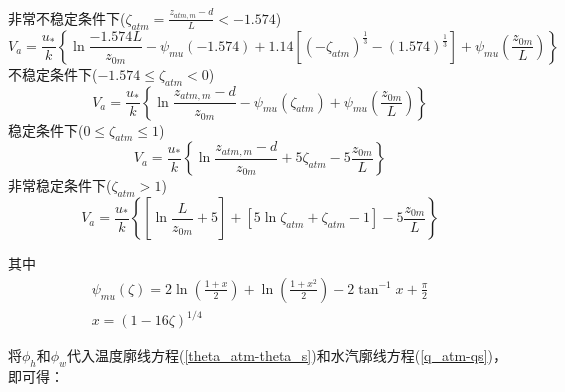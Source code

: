 \noindent 非常不稳定条件下($\zeta_{atm}=\frac{z_{atm,m}-d}{L}<-1.574$)
\begin{equation}\label{Va_VU}
V_{a}=\frac{u_{*}}{k}\left\{\ln \frac{-1.574 L}{z_{0 m}}-\psi_{mu}(-1.574)+
1.14\left[\left(-\zeta_{atm}\right)^{\frac{1}{3}}-(1.574)^{\frac{1}{3}}\right]+\psi_{mu}\left(\frac{z_{0 m}}{L}\right)\right\}
\end{equation}
不稳定条件下($-1.574\le\zeta_{atm}<0$)
\begin{equation}\label{Va_U}
V_{a}=\frac{u_{*}}{k}\left\{\ln \frac{z_{atm, m}-d}{z_{0 m}}-\psi_{mu}\left(\zeta_{atm}\right)+\psi_{mu}\left(\frac{z_{0 m}}{L}\right)\right\}
\end{equation}
稳定条件下($0\le\zeta_{atm}\le1$)
\begin{equation}\label{Va_S}
V_{a}=\frac{u_{*}}{k}\left\{\ln \frac{z_{atm, m}-d}{z_{0 m}}+5 \zeta_{atm}-5 \frac{z_{0 m}}{L}\right\}
\end{equation}
非常稳定条件下($\zeta_{atm}>1$)
\begin{equation}\label{Va_VS}
V_{a}=\frac{u_{*}}{k}\left\{\left[\ln \frac{L}{z_{0 m}}+5\right]+\left[5 \ln \zeta_{atm}+\zeta_{atm}-1\right]-5 \frac{z_{0 m}}{L}\right\}
\end{equation}

\noindent 其中
\begin{equation}\label{Psim}
\begin{array}{c}\psi_{mu}\left(\zeta\right)=2\ln{(\frac{1+x}{2})}+\ln{\left(\frac{1+x^2}{2}\right)-2}\tan^{-1}{x}+\frac{\pi}{2} \\
      x={(1-16\zeta)}^{1/4}\end{array}
\end{equation}

将$\phi_h$和$\phi_w$代入温度廓线方程(\ref{theta_atm-theta_s})和水汽廓线方程(\ref{q_atm-qs})，即可得：

